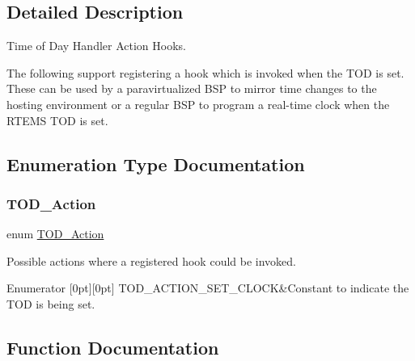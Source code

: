 \subsection{Detailed Description}
Time of Day Handler Action Hooks. 

The following support registering a hook which is invoked when the T\+OD is set. These can be used by a paravirtualized B\+SP to mirror time changes to the hosting environment or a regular B\+SP to program a real-\/time clock when the R\+T\+E\+MS T\+OD is set. 

\subsection{Enumeration Type Documentation}
\mbox{\label{group__RTEMSScoreTODHooks_gab9b3d7e3a626139950c25efa888d4332}} 
\subsubsection{\texorpdfstring{TOD\_Action}{TOD\_Action}}
{\footnotesize\ttfamily enum \mbox{\hyperlink{group__RTEMSScoreTODHooks_gab9b3d7e3a626139950c25efa888d4332}{T\+O\+D\+\_\+\+Action}}}



Possible actions where a registered hook could be invoked. 

\begin{DoxyEnumFields}{Enumerator}
[0pt][0pt]{}\mbox{\label{group__RTEMSScoreTODHooks_ggab9b3d7e3a626139950c25efa888d4332a93091d0c963aeebf2726ecdb20f74105}} 
T\+O\+D\+\_\+\+A\+C\+T\+I\+O\+N\+\_\+\+S\+E\+T\+\_\+\+C\+L\+O\+CK&Constant to indicate the T\+OD is being set. \\
\hline

\end{DoxyEnumFields}


\subsection{Function Documentation}
\mbox{\label{group__RTEMSScoreTODHooks_ga9db96e52b259d049f468578e081605ff}} 
